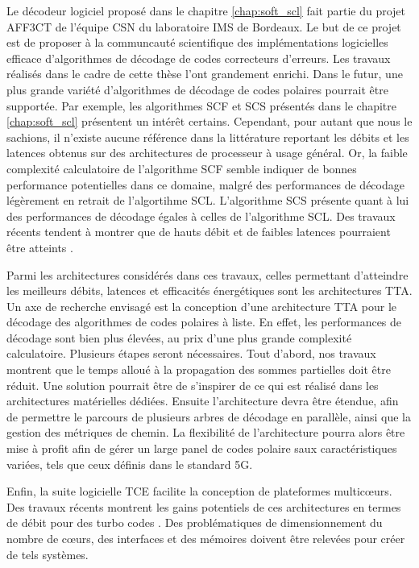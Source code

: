 Le décodeur logiciel proposé dans le chapitre \ref{chap:soft_scl} fait partie du projet AFF3CT de l'équipe CSN du laboratoire IMS de Bordeaux. Le but de ce projet est de proposer à la communcauté scientifique des implémentations logicielles efficace d'algorithmes de décodage de codes correcteurs d'erreurs. Les travaux réalisés dans le cadre de cette thèse l'ont grandement enrichi. Dans le futur, une plus grande variété d'algorithmes de décodage de codes polaires pourrait être supportée. Par exemple, les algorithmes SCF et SCS présentés dans le chapitre \ref{chap:soft_scl} présentent un intérêt certains. Cependant, pour autant que nous le sachions, il n'existe aucune référence dans la littérature reportant les débits et les latences obtenus sur des architectures de processeur à usage général. Or, la faible complexité calculatoire de l'algorithme SCF semble indiquer de bonnes performance potentielles dans ce domaine, malgré des performances de décodage légèrement en retrait de l'algortihme SCL. L'algorithme SCS présente quant à lui des performances de décodage égales à celles de l'algorithme SCL. Des travaux récents tendent à montrer que de hauts débit et de faibles latences pourraient être atteints \cite{8351832}.

Parmi les architectures considérés dans ces travaux, celles permettant d'atteindre les meilleurs débits, latences et efficacités énergétiques sont les architectures TTA. Un axe de recherche envisagé est la conception d'une architecture TTA pour le décodage des algorithmes de codes polaires à liste. En effet, les performances de décodage sont bien plus élevées, au prix d'une plus grande complexité calculatoire. Plusieurs étapes seront nécessaires. Tout d'abord, nos travaux montrent que le temps alloué à la propagation des sommes partielles doit être réduit. Une solution pourrait être de s'inspirer de ce qui est réalisé dans les architectures matérielles dédiées. Ensuite l'architecture devra être étendue, afin de permettre le parcours de plusieurs arbres de décodage en parallèle, ainsi que la gestion des métriques de chemin. La flexibilité de l'architecture pourra alors être mise à profit afin de gérer un large panel de codes polaire saux caractéristiques variées, tels que ceux définis dans le standard 5G.

Enfin, la suite logicielle TCE facilite la conception de plateformes multicœurs. Des travaux récents montrent les gains potentiels de ces architectures en termes de débit pour des turbo codes \cite{}. Des problématiques de dimensionnement du nombre de cœurs, des interfaces et des mémoires doivent être relevées pour créer de tels systèmes.
